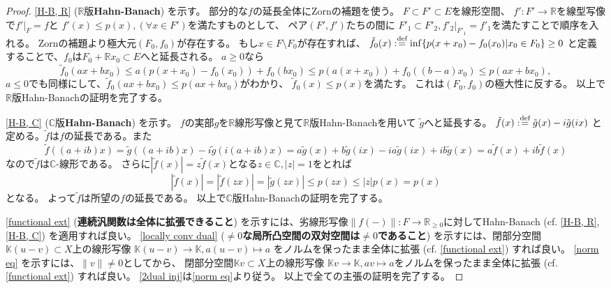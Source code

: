\documentclass[uplatex]{jsarticle}
\theoremstyle{definition}
\newcommand{\dfn}{:\overset{\mbox{{\scriptsize def}}}{=}}
\newcommand{\C}{\mathbb{C}}
\newcommand{\K}{\mathbb{K}}
\newcommand{\R}{\mathbb{R}}
\begin{document}
\begin{proof}
  \ref{H-B, R} (\(\R\)版\textbf{Hahn-Banach}) を示す。
  部分的な\(f\)の延長全体にZornの補題を使う。
  \(F\subset F'\subset E\)を線形空間、
  \(f':F'\to\R\)を線型写像で\(f'|_F=f\)と
  \(f'(x) \leq p(x), (\forall x\in F')\)を満たすものとして、
  ペア\((F',f')\)たちの間に
  \(F'_1\subset F'_2, f'_2|_{F'_1} = f'_1\)を満たすことで順序を入れる。
  Zornの補題より極大元\((F_0,f_0)\)が存在する。
  もし\(x\in F\setminus F_0\)が存在すれば、
  \(\tilde{f}_0(x) \dfn \inf\{p(x+x_0)-f_0(x_0)|x_0\in F_0\} \geq 0\)
  と定義することで、\(f_0\)は\(F_0 + \R x_0\subset E\)へと延長される。
  \(a\geq 0\)なら
  \[
  \tilde{f}_0(ax+bx_0) \leq a(p(x+x_0) - f_0(x_0)) + f_0(bx_0)
  \leq p(a(x+x_0)) + f_0((b-a)x_0)
  \leq p(ax+bx_0),
  \]
  \(a\leq 0\)でも同様にして、\(\tilde{f}_0(ax+bx_0)\leq p(ax+bx_0)\)がわかり、
  \(\tilde{f}_0(x)\leq p(x)\)を満たす。
  これは\((F_0,f_0)\)の極大性に反する。
  以上で\(\R\)版Hahn-Banachの証明を完了する。

  \ref{H-B, C} (\(\C\)版\textbf{Hahn-Banach}) を示す。
  \(f\)の実部\(g\)を\(\R\)線形写像と見て\(\R\)版Hahn-Banachを用いて
  \(\tilde{g}\)へと延長する。
  \(\tilde{f}(x) \dfn \tilde{g}(x)-i\tilde{g}(ix)\)
  と定める。\(\tilde{f}\)は\(f\)の延長である。また
  \[
  \tilde{f}((a+ib)x) = \tilde{g}((a+ib)x)-i\tilde{g}(i(a+ib)x)
  = a\tilde{g}(x) + b\tilde{g}(ix) - ia\tilde{g}(ix) + ib\tilde{g}(x)
  = a\tilde{f}(x) + ib\tilde{f}(x)
  \]
  なので\(\tilde{f}\)は\(\C\)-線形である。
  さらに\(|\tilde{f}(x)| = z\tilde{f}(x)\)となる\(z\in \C,|z|=1\)をとれば
  \[
  |\tilde{f}(x)| = |\tilde{f}(zx)|
  = |\tilde{g}(zx)| \leq p(zx) \leq |z|p(x) = p(x)
  \]
  となる。
  よって\(\tilde{f}\)は所望の\(f\)の延長である。
  以上で\(\C\)版Hahn-Banachの証明を完了する。

  \ref{functional ext}
  (\textbf{連続汎関数は全体に拡張できること})
  を示すには、劣線形写像\(\|f(-)\|: F\to \R_{\geq 0}\)に対してHahn-Banach
  (cf. \ref{H-B, R}, \ref{H-B, C}) を適用すれば良い。
  \ref{locally conv dual}
  (\textbf{\(\neq 0\)な局所凸空間の双対空間は\(\neq 0\)であること})
  を示すには、閉部分空間\(\K(u-v)\subset X\)上の線形写像
  \(\K(u-v)\to \K, a(u-v)\mapsto a\)
  をノルムを保ったまま全体に拡張 (cf. \ref{functional ext}) すれば良い。
  \ref{norm eq}
  を示すには、\(\|v\|\neq 0\)としてから、
  閉部分空間\(\K v\subset X\)上の線形写像
  \(\K v\to \K, av\mapsto a\)をノルムを保ったまま全体に拡張
  (cf. \ref{functional ext}) すれば良い。
  \ref{2dual inj}は\ref{norm eq}より従う。
  以上で全ての主張の証明を完了する。
\end{proof}
\end{document}
